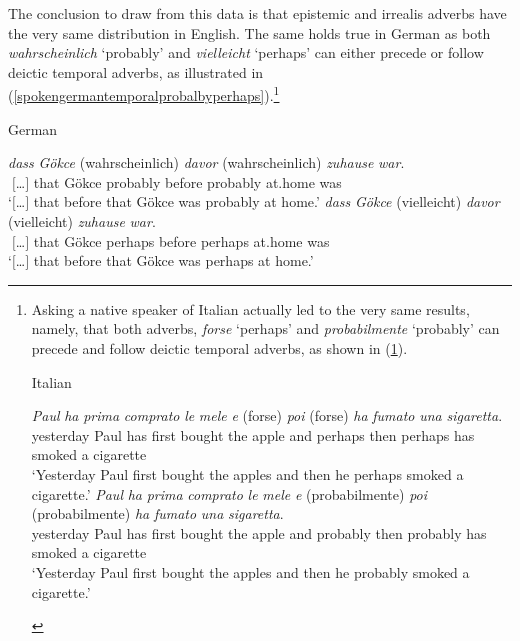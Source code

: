 \noindent The conclusion to draw from this data is that epistemic and irrealis adverbs have the very same distribution in English. The same holds true in German as both \textit{wahrscheinlich} `probably' and \textit{vielleicht} `perhaps' can either precede or follow deictic temporal adverbs, as illustrated in (\ref{spokengermantemporalprobalbyperhaps}).\footnote{ Asking a native speaker of Italian actually led to the very same results, namely, that both adverbs, \textit{forse} `perhaps' and \textit{probabilmente} `probably' can precede and follow deictic temporal adverbs, as shown in (\ref{italianforseperhaps}).

\begin{exe}
\ex Italian \label{italianforseperhaps}\begin{xlist} 
\ex {} {\textit{Paul}} {\textit{ha}} {\textit{prima}} {\textit{comprato}} {\textit{le}} {\textit{mele}} {\textit{e}} {(forse)} {\textit{poi}} {(forse)} {\textit{ha}} {\textit{fumato}} {\textit{una}} {\textit{sigaretta}}.\\
{yesterday} {Paul} {has} {first} {bought} {the} {apple} {and} {perhaps} {then} {perhaps} {has} {smoked} {a} {cigarette}\\ 
\trans `Yesterday Paul first bought the apples and then he perhaps smoked a cigarette.' \label{italianforseperhapsa}
\ex {} {\textit{Paul}} {\textit{ha}} {\textit{prima}} {\textit{comprato}} {\textit{le}} {\textit{mele}} {\textit{e}} {(probabilmente)} {\textit{poi}} {(probabilmente)} {\textit{ha}} {\textit{fumato}} {\textit{una}} {\textit{sigaretta}}.\\
{yesterday} {Paul} {has} {first} {bought} {the} {apple} {and} {probably} {then} {probably} {has} {smoked} {a} {cigarette}\\ 
\trans `Yesterday Paul first bought the apples and then he probably smoked a cigarette.' \label{italianforseperhapsb}

\end{xlist}
\end{exe}

}

\begin{exe}
\ex German\label{spokengermantemporalprobalbyperhaps}\begin{xlist} 
\ex \gll{\textcolor{white}{`}$[$\dots $]$} {\textit{dass}} {\textit{Gökce}} {(wahrscheinlich)} {\textit{davor}} {(wahrscheinlich)} {\textit{zuhause}} {\textit{war}}.\\
{\textcolor{white}{`}$[$\dots $]$} {that} {Gökce} {probably} {before} {probably} {at.home} {was}\\
\trans `$[$\dots $]$ that before that Gökce was probably at home.' \label{spokengermantemporalprobalbyperhapsa}
\ex \gll{\textcolor{white}{`}$[$\dots $]$} {\textit{dass}} {\textit{Gökce}} {(vielleicht)} {\textit{davor}} {(vielleicht)} {\textit{zuhause}} {\textit{war}}.\\
{\textcolor{white}{`}$[$\dots $]$} {that} {Gökce} {perhaps} {before} {perhaps} {at.home} {was}\\
\trans `$[$\dots $]$ that before that Gökce was perhaps at home.' \label{spokengermantemporalprobalbyperhapsb}
\end{xlist}
\end{exe}

